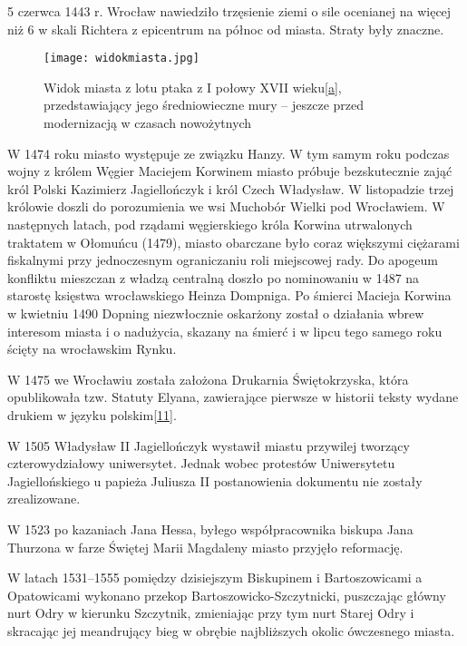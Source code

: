 \documentclass{article}
\begin{document}
5 czerwca 1443 r. Wrocław nawiedziło trzęsienie ziemi o sile ocenianej na więcej niż 6 w skali Richtera z epicentrum na północ od miasta. Straty były znaczne.

\begin{wrapfigure}{r}{0.35\textwidth} 
\begin{center}
\vspace{-20pt}
\texttt{[image: widokmiasta.jpg]}
\end{center}
\vspace{-20pt}
\caption{Widok miasta z lotu ptaka z I połowy XVII wieku\hyperref[a]{[a]}, przedstawiający jego średniowieczne mury – jeszcze przed modernizacją w czasach nowożytnych}
\vspace{-10pt}
\end{wrapfigure}

W 1474 roku miasto występuje ze związku Hanzy. W tym samym roku podczas wojny z królem Węgier Maciejem Korwinem miasto próbuje bezskutecznie zająć król Polski Kazimierz Jagiellończyk i król Czech Władysław. W listopadzie trzej królowie doszli do porozumienia we wsi Muchobór Wielki pod Wrocławiem. W następnych latach, pod rządami węgierskiego króla Korwina utrwalonych traktatem w Ołomuńcu (1479), miasto obarczane było coraz większymi ciężarami fiskalnymi przy jednoczesnym ograniczaniu roli miejscowej rady. Do apogeum konfliktu mieszczan z władzą centralną doszło po nominowaniu w 1487 na starostę księstwa wrocławskiego Heinza Dompniga. Po śmierci Macieja Korwina w kwietniu 1490 Dopning niezwłocznie oskarżony został o działania wbrew interesom miasta i o nadużycia, skazany na śmierć i w lipcu tego samego roku ścięty na wrocławskim Rynku.

W 1475 we Wrocławiu została założona Drukarnia Świętokrzyska, która opublikowała tzw. Statuty Elyana, zawierające pierwsze w historii teksty wydane drukiem w języku polskim\hyperref[11]{[11]}.

W 1505 Władysław II Jagiellończyk wystawił miastu przywilej tworzący czterowydziałowy uniwersytet. Jednak wobec protestów Uniwersytetu Jagiellońskiego u papieża Juliusza II postanowienia dokumentu nie zostały zrealizowane.

W 1523 po kazaniach Jana Hessa, byłego współpracownika biskupa Jana Thurzona w farze Świętej Marii Magdaleny miasto przyjęło reformację.

W latach 1531–1555 pomiędzy dzisiejszym Biskupinem i Bartoszowicami a Opatowicami wykonano przekop Bartoszowicko-Szczytnicki, puszczając główny nurt Odry w kierunku Szczytnik, zmieniając przy tym nurt Starej Odry i skracając jej meandrujący bieg w obrębie najbliższych okolic ówczesnego miasta.
\end{document}
